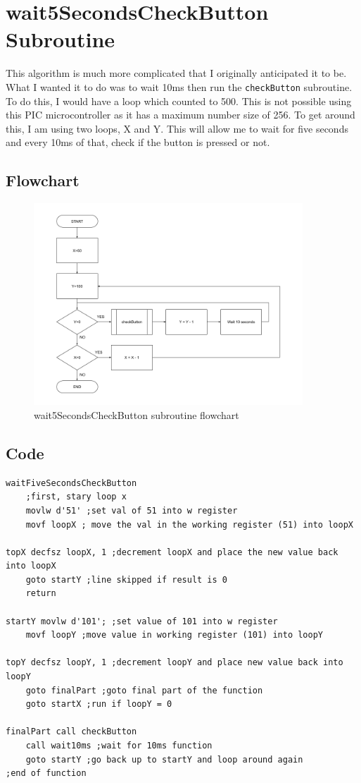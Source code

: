 \section{wait5SecondsCheckButton Subroutine}
This algorithm is much more complicated that I originally anticipated it to be. What I wanted it to do was to wait 10ms then run the \verb|checkButton| subroutine. To do this, I would have a loop which counted to 500. This is not possible using this PIC microcontroller as it has a maximum number size of 256. To get around this, I am using two loops, X and Y. This will allow me to wait for five seconds and every 10ms of that, check if the button is pressed or not.
\subsection*{Flowchart}
\begin{figure}[H]
    \centering
    \includegraphics[width=0.9\textwidth]{images/flowchart-wait5Sec.png}
    \caption{wait5SecondsCheckButton subroutine flowchart}
    \label{fig:flowchart-wait5Sec}
\end{figure}
\subsection*{Code}
\begin{lstlisting}[language={[x86masm]Assembler}, style=assembly, caption=wait5SecondsCheckButton subroutine]
waitFiveSecondsCheckButton
	;first, stary loop x
	movlw d'51' ;set val of 51 into w register
	movf loopX ; move the val in the working register (51) into loopX

topX decfsz loopX, 1 ;decrement loopX and place the new value back into loopX
	goto startY ;line skipped if result is 0
	return

startY movlw d'101'; ;set value of 101 into w register
	movf loopY ;move value in working register (101) into loopY

topY decfsz loopY, 1 ;decrement loopY and place new value back into loopY
	goto finalPart ;goto final part of the function
	goto startX ;run if loopY = 0

finalPart call checkButton
	call wait10ms ;wait for 10ms function
	goto startY ;go back up to startY and loop around again
;end of function
\end{lstlisting}

